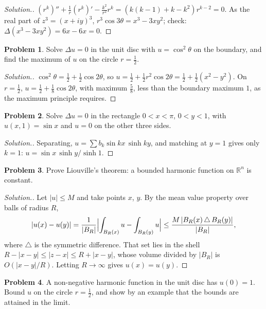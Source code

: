 \documentclass[11pt,a4paper]{article}
\numberwithin{equation}{section}
\theoremstyle{definition}
\newtheorem{problemx}{Problem}[subsection]
\newenvironment{problem}{\begin{problemx}}{\end{problemx}}
\newenvironment{solution}
  {\renewcommand{\qedsymbol}{}\begin{proof}[\textit{Solution}.]}
  {\end{proof}}
\begin{document}
\begin{solution}
$(r^k)'' + \frac1r(r^k)' - \frac{k^2}{r^2}r^k = (k(k - 1) + k - k^2)r^{k - 2} = 0$. As the real part of $z^3 = (x + iy)^3$, $r^3\cos 3\theta = x^3 - 3xy^2$; check: $\Delta(x^3 - 3xy^2) = 6x - 6x = 0$.
\end{solution}

\begin{problem}
Solve $\Delta u = 0$ in the unit disc with $u = \cos^2\theta$ on the boundary, and find the maximum of $u$ on the circle $r = \frac12$.
\end{problem}

\begin{solution}
$\cos^2\theta = \frac12 + \frac12\cos 2\theta$, so $u = \frac12 + \frac12r^2\cos 2\theta = \frac12 + \frac12(x^2 - y^2)$. On $r = \frac12$, $u = \frac12 + \frac18\cos 2\theta$, with maximum $\frac58$, less than the boundary maximum $1$, as the maximum principle requires.
\end{solution}

\begin{problem}
Solve $\Delta u = 0$ in the rectangle $0 < x < \pi$, $0 < y < 1$, with $u(x, 1) = \sin x$ and $u = 0$ on the other three sides.
\end{problem}

\begin{solution}
Separating, $u = \sum b_k\sin kx\,\sinh ky$, and matching at $y = 1$ gives only $k = 1$: $u = \sin x\,\sinh y/\sinh 1$.
\end{solution}

\begin{problem}
\label{prob:liouville}
Prove Liouville's theorem: a bounded harmonic function on $\mathbb R^n$ is constant.
\end{problem}

\begin{solution}
Let $|u| \leq M$ and take points $x$, $y$. By the mean value property over balls of radius $R$,
\[
|u(x) - u(y)| = \frac1{|B_R|}\Bigl|\int_{B_R(x)}u - \int_{B_R(y)}u\Bigr| \leq \frac{M\,|B_R(x)\,\triangle\,B_R(y)|}{|B_R|} ,
\]
where $\triangle$ is the symmetric difference. That set lies in the shell $R - |x - y| \leq |z - x| \leq R + |x - y|$, whose volume divided by $|B_R|$ is $O(|x - y|/R)$. Letting $R \to \infty$ gives $u(x) = u(y)$.
\end{solution}

\begin{problem}
A non-negative harmonic function in the unit disc has $u(0) = 1$. Bound $u$ on the circle $r = \frac12$, and show by an example that the bounds are attained in the limit.
\end{problem}
\end{document}
